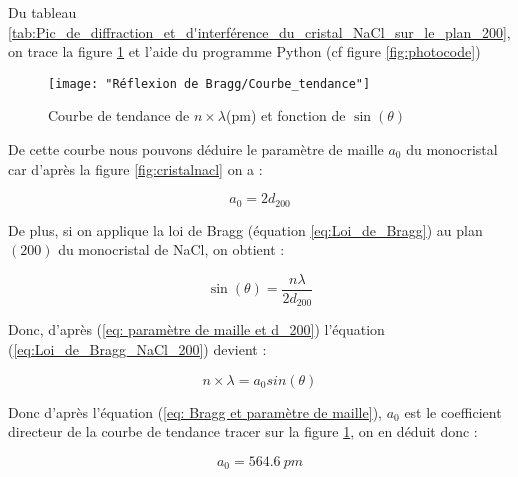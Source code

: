 \newpage
Du tableau \ref{tab:Pic_de_diffraction_et_d'interférence_du_cristal_NaCl_sur_le_plan_200}, on trace la figure \ref{fig:courbetendance} et l'aide du programme Python (cf figure \ref{fig:photocode})


\begin{figure}[h!]
	\centering
	\texttt{[image: "Réflexion de Bragg/Courbe\_tendance"]}
	\caption{Courbe de tendance de $n \times \lambda $(pm) et fonction de 	$\sin(\theta)$ }
	\label{fig:courbetendance}
\end{figure}

\begin{flushleft}
De cette courbe nous pouvons déduire le paramètre de maille $a_0$ du monocristal car d'après la figure \ref{fig:cristalnacl} on a :
	
	\begin{equation}\label{eq: paramètre de maille et d_200}
		a_0=2d_{200}
	\end{equation}

	
De plus, si on applique la loi de Bragg (équation \ref{eq:Loi_de_Bragg}) au plan $(200)$ du monocristal de NaCl, on obtient : 

\begin{equation} \label{eq:Loi_de_Bragg_NaCl_200}
	\sin (\theta ) = \frac{n \lambda }{2 d_{200}}
\end{equation}
	
	
Donc, d'après (\ref{eq: paramètre de maille et d_200}) l'équation (\ref{eq:Loi_de_Bragg_NaCl_200}) devient :
	
	\begin{equation}\label{eq: Bragg et paramètre de maille}
		n \times \lambda = a_0sin(\theta)
	\end{equation}
	
	
	Donc d'après l'équation (\ref{eq: Bragg et paramètre de maille}), $a_0$ est le coefficient directeur de la courbe  de tendance tracer sur la figure \ref{fig:courbetendance}, on en déduit donc :
	
	\begin{equation}
		\boxed{a_0 = 564.6 \ pm}
	\end{equation}
	

\end{flushleft}
\newpage

